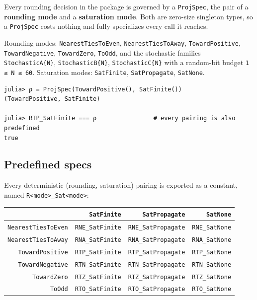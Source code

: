 \label{714366806163910976}{}


Every rounding decision in the package is governed by a \texttt{ProjSpec}, the pair of a \textbf{rounding mode} and a \textbf{saturation mode}. Both are zero-size singleton types, so a \texttt{ProjSpec} costs nothing and fully specializes every call it reaches.



Rounding modes: \texttt{NearestTiesToEven}, \texttt{NearestTiesToAway}, \texttt{TowardPositive}, \texttt{TowardNegative}, \texttt{TowardZero}, \texttt{ToOdd}, and the stochastic families \texttt{StochasticA\{N\}}, \texttt{StochasticB\{N\}}, \texttt{StochasticC\{N\}} with a random-bit budget \texttt{1 ≤ N ≤ 60}. Saturation modes: \texttt{SatFinite}, \texttt{SatPropagate}, \texttt{SatNone}.




\begin{verbatim}
julia> ρ = ProjSpec(TowardPositive(), SatFinite())
(TowardPositive, SatFinite)

julia> RTP_SatFinite === ρ                # every pairing is also predefined
true
\end{verbatim}



\subsection{Predefined specs}



\label{13218842448245266752}{}


Every deterministic (rounding, saturation) pairing is exported as a constant, named \texttt{R<mode>\_Sat<mode>}:




\begin{table}[h]
\centering
\begin{tabulary}{\linewidth}{R R R R}
\toprule
 & \texttt{SatFinite} & \texttt{SatPropagate} & \texttt{SatNone} \\
\toprule
\texttt{NearestTiesToEven} & \texttt{RNE\_SatFinite} & \texttt{RNE\_SatPropagate} & \texttt{RNE\_SatNone} \\
\texttt{NearestTiesToAway} & \texttt{RNA\_SatFinite} & \texttt{RNA\_SatPropagate} & \texttt{RNA\_SatNone} \\
\texttt{TowardPositive} & \texttt{RTP\_SatFinite} & \texttt{RTP\_SatPropagate} & \texttt{RTP\_SatNone} \\
\texttt{TowardNegative} & \texttt{RTN\_SatFinite} & \texttt{RTN\_SatPropagate} & \texttt{RTN\_SatNone} \\
\texttt{TowardZero} & \texttt{RTZ\_SatFinite} & \texttt{RTZ\_SatPropagate} & \texttt{RTZ\_SatNone} \\
\texttt{ToOdd} & \texttt{RTO\_SatFinite} & \texttt{RTO\_SatPropagate} & \texttt{RTO\_SatNone} \\
\bottomrule
\end{tabulary}

\end{table}



